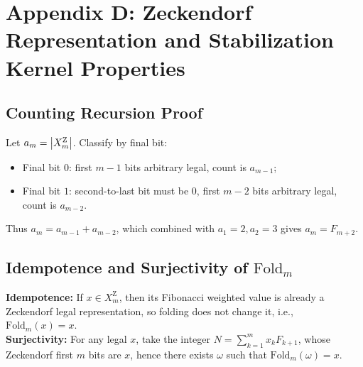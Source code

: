 \section{Appendix D: Zeckendorf Representation and Stabilization Kernel Properties}
\label{app:zeckendorf-fold}

\subsection{Counting Recursion Proof}

Let $a_m=\left\lvert X_m^{\mathrm Z}\right\rvert$. Classify by final bit:
\begin{itemize}
  \item Final bit $0$: first $m-1$ bits arbitrary legal, count is $a_{m-1}$;
  \item Final bit $1$: second-to-last bit must be $0$, first $m-2$ bits arbitrary legal, count is $a_{m-2}$.
\end{itemize}
Thus $a_m=a_{m-1}+a_{m-2}$, which combined with $a_1=2,a_2=3$ gives $a_m=F_{m+2}$.

\subsection{\texorpdfstring{Idempotence and Surjectivity of $\mathrm{Fold}_m$}{Idempotence and Surjectivity of Fold\_m}}

\textbf{Idempotence:} If $x\in X_m^{\mathrm Z}$, then its Fibonacci weighted value is already a Zeckendorf legal representation, so folding does not change it, i.e., $\mathrm{Fold}_m(x)=x$.\\
\textbf{Surjectivity:} For any legal $x$, take the integer $N=\sum_{k=1}^m x_k F_{k+1}$, whose Zeckendorf first $m$ bits are $x$, hence there exists $\omega$ such that $\mathrm{Fold}_m(\omega)=x$.
